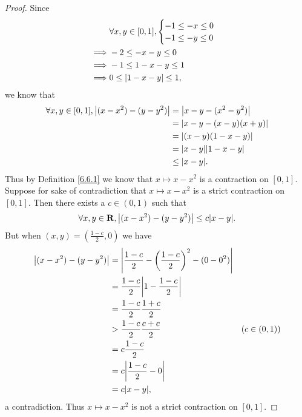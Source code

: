 \begin{proof}
    Since
    \begin{align*}
                 & \forall x, y \in [0, 1], \begin{cases}
                                                -1 \leq -x \leq 0 \\
                                                -1 \leq -y \leq 0
                                            \end{cases} \\
        \implies & -2 \leq -x - y \leq 0                      \\
        \implies & -1 \leq 1 - x - y \leq 1                   \\
        \implies & 0 \leq \left\lvert1 - x - y\right\rvert \leq 1,
    \end{align*}
    we know that
    \begin{align*}
        \forall x, y \in [0, 1], \abs{(x - x^2) - (y - y^2)} & = \abs{x - y - (x^2 - y^2)}    \\
                                                             & = \abs{x - y - (x - y)(x + y)} \\
                                                             & = \abs{(x - y)(1 - x - y)}     \\
                                                             & = \abs{x - y} \abs{1 - x - y}  \\
                                                             & \leq \abs{x - y}.
    \end{align*}
    Thus by Definition \ref{6.6.1} we know that \(x \mapsto x - x^2\) is a contraction on \([0, 1]\).
    Suppose for sake of contradiction that \(x \mapsto x - x^2\) is a strict contraction on \([0, 1]\).
    Then there exists a \(c \in (0, 1)\) such that
    \[
        \forall x, y \in \R, \abs{(x - x^2) - (y - y^2)} \leq c \abs{x - y}.
    \]
    But when \((x, y) = (\frac{1 - c}{2}, 0)\) we have
    \begin{align*}
        \abs{(x - x^2) - (y - y^2)} & = \abs{\frac{1 - c}{2} - \bigg(\frac{1 - c}{2}\bigg)^2 - (0 - 0^2)}                  \\
                                    & = \frac{1 - c}{2} \abs{1 - \frac{1 - c}{2}}                                          \\
                                    & = \frac{1 - c}{2} \frac{1 + c}{2}                                                    \\
                                    & > \frac{1 - c}{2} \frac{c + c}{2}                                   & (c \in (0, 1)) \\
                                    & = c \frac{1 - c}{2}                                                                  \\
                                    & = c \abs{\frac{1 - c}{2} - 0}                                                        \\
                                    & = c \abs{x - y},
    \end{align*}
    a contradiction.
    Thus \(x \mapsto x - x^2\) is not a strict contraction on \([0, 1]\).
\end{proof}

